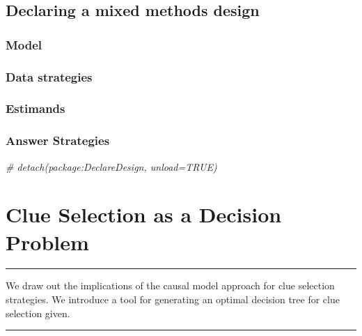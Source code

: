 \documentclass[12pt,]{book}
\newenvironment{Shaded}{\begin{snugshade}}{\end{snugshade}}
\newcommand{\CommentTok}[1]{\textcolor[rgb]{0.56,0.35,0.01}{\textit{#1}}}
\begin{document}
\hypertarget{declaring-a-mixed-methods-design}{%
\section{Declaring a mixed methods design}\label{declaring-a-mixed-methods-design}}

\hypertarget{model}{%
\subsection{Model}\label{model}}

\hypertarget{data-strategies}{%
\subsection{Data strategies}\label{data-strategies}}

\hypertarget{estimands}{%
\subsection{Estimands}\label{estimands}}

\hypertarget{answer-strategies}{%
\subsection{Answer Strategies}\label{answer-strategies}}

\begin{Shaded}
\begin{Highlighting}[]
\CommentTok{# detach(package:DeclareDesign, unload=TRUE)}
\end{Highlighting}
\end{Shaded}

\hypertarget{clue-selection-as-a-decision-problem}{%
\chapter{Clue Selection as a Decision Problem}\label{clue-selection-as-a-decision-problem}}

\begin{center}\rule{0.5\linewidth}{\linethickness}\end{center}

We draw out the implications of the causal model approach for clue selection strategies. We introduce a tool for generating an optimal decision tree for clue selection given.

\begin{center}\rule{0.5\linewidth}{\linethickness}\end{center}
\end{document}
